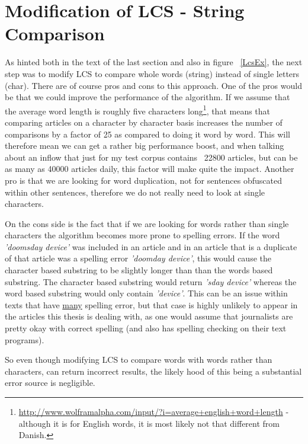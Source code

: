 \section{Modification of LCS - String Comparison}
As hinted both in the text of the last section and also in figure ~\ref{LcsEx}, the next step was to modify LCS to compare whole words (string) instead of single letters (char). There are of course pros and cons to this approach. One of the pros would be that we could improve the performance of the algorithm. If we assume that the average word length is roughly five characters long\footnote{\url{http://www.wolframalpha.com/input/?i=average+english+word+length} - although it is for English words, it is most likely not that different from Danish.}, that means that comparing articles on a character by character basis increases the number of comparisons by a factor of 25 as compared to doing it word by word. This will therefore mean we can get a rather big performance boost, and when talking about an inflow that just for my test corpus contains ~22800 articles, but can be as many as 40000 articles daily, this factor will make quite the impact. Another pro is that we are looking for word duplication, not for sentences obfuscated within other sentences, therefore we do not really need to look at single characters.

On the cons side is the fact that if we are looking for words rather than single characters the algorithm becomes more prone to spelling errors. If the word \textit{'doomsday device'} was included in an article and in an article that is a duplicate of that article was a spelling error \textit{'doomday device'}, this would cause the character based substring to be slightly longer than than the words based substring. The character based substring would return \textit{'sday device'} whereas the word based substring would only contain \textit{'device'}. This can be an issue within texts that have \underline{many} spelling error, but that case is highly unlikely to appear in the articles this thesis is dealing with, as one would assume that journalists are pretty okay with correct spelling (and also has spelling checking on their text programs). 

So even though modifying LCS to compare words with words rather than characters, can return incorrect results, the likely hood of this being a substantial error source is negligible.


